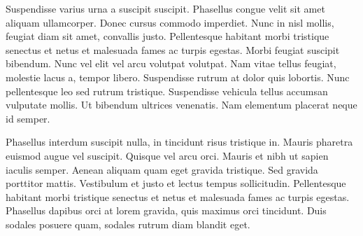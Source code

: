 Suspendisse varius urna a suscipit suscipit. Phasellus congue velit sit amet aliquam ullamcorper. Donec cursus commodo imperdiet. Nunc in nisl mollis, feugiat diam sit amet, convallis justo. Pellentesque habitant morbi tristique senectus et netus et malesuada fames ac turpis egestas. Morbi feugiat suscipit bibendum. Nunc vel elit vel arcu volutpat volutpat. Nam vitae tellus feugiat, molestie lacus a, tempor libero. Suspendisse rutrum at dolor quis lobortis. Nunc pellentesque leo sed rutrum tristique. Suspendisse vehicula tellus accumsan vulputate mollis. Ut bibendum ultrices venenatis. Nam elementum placerat neque id semper.

Phasellus interdum suscipit nulla, in tincidunt risus tristique in. Mauris pharetra euismod augue vel suscipit. Quisque vel arcu orci. Mauris et nibh ut sapien iaculis semper. Aenean aliquam quam eget gravida tristique. Sed gravida porttitor mattis. Vestibulum et justo et lectus tempus sollicitudin. Pellentesque habitant morbi tristique senectus et netus et malesuada fames ac turpis egestas. Phasellus dapibus orci at lorem gravida, quis maximus orci tincidunt. Duis sodales posuere quam, sodales rutrum diam blandit eget.